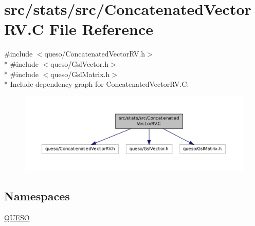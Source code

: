 \hypertarget{_concatenated_vector_r_v_8_c}{\section{src/stats/src/\-Concatenated\-Vector\-R\-V.C File Reference}
\label{_concatenated_vector_r_v_8_c}
}
{\ttfamily \#include $<$queso/\-Concatenated\-Vector\-R\-V.\-h$>$}\\*
{\ttfamily \#include $<$queso/\-Gsl\-Vector.\-h$>$}\\*
{\ttfamily \#include $<$queso/\-Gsl\-Matrix.\-h$>$}\\*
Include dependency graph for Concatenated\-Vector\-R\-V.\-C\-:
\nopagebreak
\begin{figure}[H]
\begin{center}
\leavevmode
\includegraphics[width=350pt]{_concatenated_vector_r_v_8_c__incl}
\end{center}
\end{figure}
\subsection*{Namespaces}
\begin{DoxyCompactItemize}
\item 
\hyperlink{namespace_q_u_e_s_o}{Q\-U\-E\-S\-O}
\end{DoxyCompactItemize}
